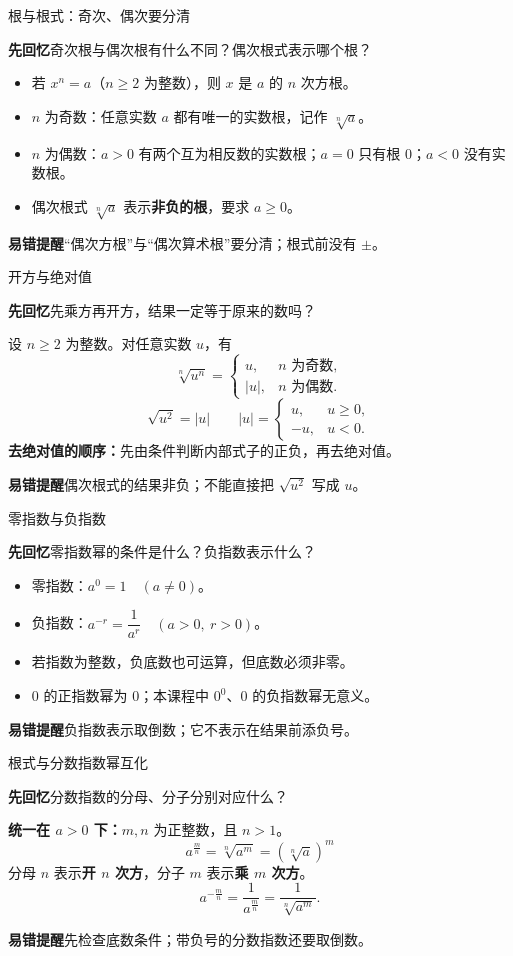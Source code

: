 \documentclass[UTF8,10pt,aspectratio=169]{ctexbeamer}
\newcommand{\Recall}[1]{\par\noindent\textcolor{KnowledgeBlue}{\textbf{先回忆}\quad #1}\par\vspace{0.3cm}}
\newcommand{\Pitfall}[1]{\par\vspace{0.22cm}\noindent\textbf{易错提醒}\quad #1\par}
\begin{document}
\begin{frame}[t]{根与根式：奇次、偶次要分清}
\Recall{奇次根与偶次根有什么不同？偶次根式表示哪个根？}
\pause
\begin{itemize}
\item 若 $x^n=a$（$n\ge2$ 为整数），则 $x$ 是 $a$ 的 $n$ 次方根。
\item $n$ 为奇数：任意实数 $a$ 都有唯一的实数根，记作 $\sqrt[n]{a}$。
\item $n$ 为偶数：$a>0$ 有两个互为相反数的实数根；$a=0$ 只有根 $0$；$a<0$ 没有实数根。
\item 偶次根式 $\sqrt[n]{a}$ 表示\textbf{非负的根}，要求 $a\ge0$。
\end{itemize}
\Pitfall{“偶次方根”与“偶次算术根”要分清；根式前没有 $\pm$。}
\end{frame}

\begin{frame}[t]{开方与绝对值}
\Recall{先乘方再开方，结果一定等于原来的数吗？}
\pause
设 $n\ge2$ 为整数。对任意实数 $u$，有
\[
\sqrt[n]{u^n}=\begin{cases}u,&n\text{ 为奇数},\\ |u|,&n\text{ 为偶数}.\end{cases}
\]
\[
\boxed{\sqrt{u^2}=|u|}\qquad
|u|=\begin{cases}u,&u\ge0,\\-u,&u<0.\end{cases}
\]
\textbf{去绝对值的顺序：}先由条件判断内部式子的正负，再去绝对值。
\Pitfall{偶次根式的结果非负；不能直接把 $\sqrt{u^2}$ 写成 $u$。}
\end{frame}

\begin{frame}[t]{零指数与负指数}
\Recall{零指数幂的条件是什么？负指数表示什么？}
\pause
\begin{itemize}
\item 零指数：$\boxed{a^0=1\quad(a\ne0)}$。
\item 负指数：$\boxed{a^{-r}=\dfrac1{a^r}\quad(a>0,\ r>0)}$。
\item 若指数为整数，负底数也可运算，但底数必须非零。
\item $0$ 的正指数幂为 $0$；本课程中 $0^0$、$0$ 的负指数幂无意义。
\end{itemize}
\Pitfall{负指数表示取倒数；它不表示在结果前添负号。}
\end{frame}

\begin{frame}[t]{根式与分数指数幂互化}
\Recall{分数指数的分母、分子分别对应什么？}
\pause
\textbf{统一在 $a>0$ 下：}$m,n$ 为正整数，且 $n>1$。
\[
\boxed{a^{\frac mn}=\sqrt[n]{a^m}=(\sqrt[n]{a})^m}
\]
分母 $n$ 表示\textbf{开 $n$ 次方}，分子 $m$ 表示\textbf{乘 $m$ 次方}。
\[
a^{-\frac mn}=\frac1{a^{\frac mn}}=\frac1{\sqrt[n]{a^m}}.
\]
\Pitfall{先检查底数条件；带负号的分数指数还要取倒数。}
\end{frame}
\end{document}
